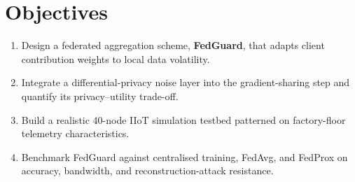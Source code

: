 \section{Objectives}
\begin{enumerate}[leftmargin=1.6em,label=\textbf{O\arabic*.}]
  \item Design a federated aggregation scheme, \textbf{FedGuard}, that adapts client
        contribution weights to local data volatility.
  \item Integrate a differential-privacy noise layer into the gradient-sharing step and
        quantify its privacy--utility trade-off.
  \item Build a realistic 40-node IIoT simulation testbed patterned on factory-floor
        telemetry characteristics.
  \item Benchmark FedGuard against centralised training, FedAvg, and FedProx on
        accuracy, bandwidth, and reconstruction-attack resistance.
\end{enumerate}
